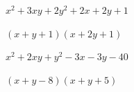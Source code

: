 \documentclass[windows,csize4]{BHCexam}
\begin{document}
\begin{groups}

    \begin{questions}[]
        \question[5]$x^2+3xy+2y^2+2x+2y+1$
        \begin{solution}{0.5cm}
            \methodonly $(x+y+1)(x+2y+1)$
        \end{solution}
        \vspace{3.5cm}

        \question[5]$x^2+2xy+y^2-3x-3y-40$
        \begin{solution}{0.5cm}
            \methodonly $(x+y-8)(x+y+5)$
        \end{solution}
        \vspace{3.5cm}





    \end{questions}

\end{groups}
\label{lastpage}
\end{document}
